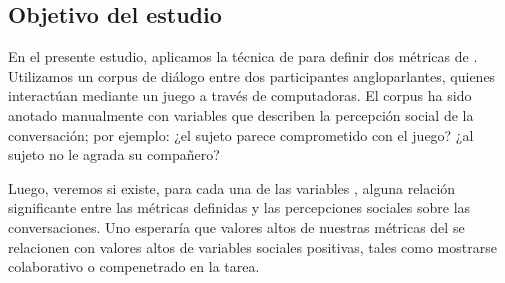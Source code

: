 \subsection{Objetivo del estudio}

En el presente estudio, aplicamos la técnica de \TAMA para definir dos métricas de \entrainment. Utilizamos un corpus de diálogo entre dos participantes angloparlantes, quienes interactúan mediante un juego a través de computadoras. El corpus ha sido anotado manualmente con variables que describen la percepción social de la conversación; por ejemplo: ¿el sujeto parece comprometido con el juego? ¿al sujeto no le agrada su compañero?

Luego, veremos si existe, para cada una de las variables \ap,  alguna relación significante entre las métricas definidas y las percepciones sociales sobre las conversaciones. Uno esperaría que valores altos de nuestras métricas del \entrainment se relacionen con valores altos de variables sociales positivas, tales como mostrarse colaborativo o compenetrado en la tarea. 

